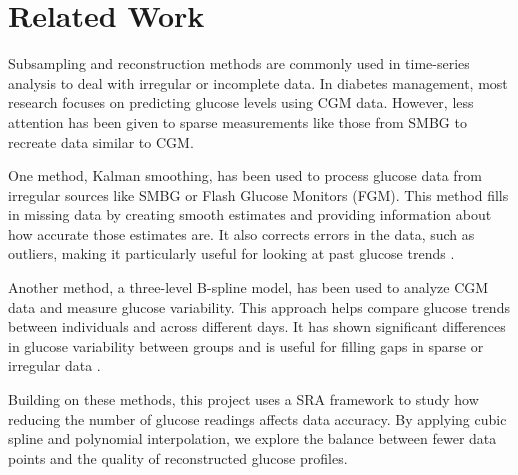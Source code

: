 
\section{Related Work}

Subsampling and reconstruction methods are commonly used in time-series analysis to deal with irregular or incomplete data. In diabetes management, most research focuses on predicting glucose levels using CGM data. However, less attention has been given to sparse measurements like those from SMBG to recreate data similar to CGM.

One method, Kalman smoothing, has been used to process glucose data from irregular sources like SMBG or Flash Glucose Monitors (FGM). This method fills in missing data by creating smooth estimates and providing information about how accurate those estimates are. It also corrects errors in the data, such as outliers, making it particularly useful for looking at past glucose trends \cite{Staal2019}.

Another method, a three-level B-spline model, has been used to analyze CGM data and measure glucose variability. This approach helps compare glucose trends between individuals and across different days. It has shown significant differences in glucose variability between groups and is useful for filling gaps in sparse or irregular data \cite{Zheng2011}.

Building on these methods, this project uses a SRA framework to study how reducing the number of glucose readings affects data accuracy. By applying cubic spline and polynomial interpolation, we explore the balance between fewer data points and the quality of reconstructed glucose profiles.

